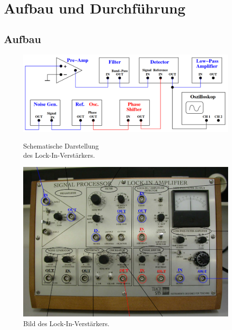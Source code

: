 \section{Aufbau und Durchführung}

\subsection{Aufbau}
\label{sec:Aufbau}

\begin{figure}
    \begin{minipage}[b]{.4\linewidth} %
       \includegraphics[width=\linewidth]{img/Schema.png}
       \caption{Schematische Darstellung\\ des Lock-In-Verstärkers.\cite{V303}}
       \label{fig:SchematischeDarstellungLockIn}
    \end{minipage}
    \hspace{.1\linewidth}%
    \begin{minipage}[b]{.4\linewidth} %
       \includegraphics[width=\linewidth]{img/BildLockIn.png}
       \caption{Bild des Lock-In-Verstärkers.\cite{V303}}
       \label{fig:BildLockIn}
    \end{minipage}
 \end{figure}

